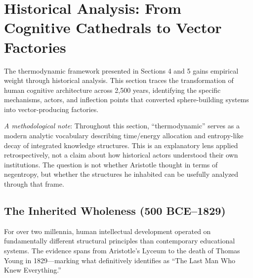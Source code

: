 %
% 

\section{Historical Analysis: From Cognitive Cathedrals to Vector Factories}
\label{sec:historical}

The thermodynamic framework presented in Sections 4 and 5 gains empirical weight through historical analysis. This section traces the transformation of human cognitive architecture across 2,500 years, identifying the specific mechanisms, actors, and inflection points that converted sphere-building systems into vector-producing factories.

\textit{A methodological note}: Throughout this section, ``thermodynamic'' serves as a modern analytic vocabulary describing time/energy allocation and entropy-like decay of integrated knowledge structures. This is an explanatory lens applied retrospectively, not a claim about how historical actors understood their own institutions. The question is not whether Aristotle thought in terms of negentropy, but whether the structures he inhabited can be usefully analyzed through that frame.

\subsection{The Inherited Wholeness (500 BCE--1829)}

For over two millennia, human intellectual development operated on fundamentally different structural principles than contemporary educational systems. The evidence spans from Aristotle's Lyceum to the death of Thomas Young in 1829---marking what \citet{robinson2006} definitively identifies as ``The Last Man Who Knew Everything.''

